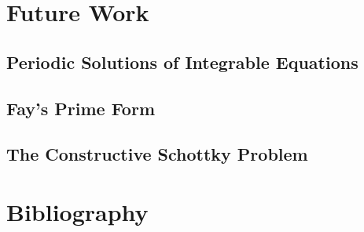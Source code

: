 \documentclass[10pt,twoside]{article}
\numberwithin{equation}{section}
\begin{document}
\section{Future Work}

\subsection{Periodic Solutions of Integrable Equations}

\subsection{Fay's Prime Form}

\subsection{The Constructive Schottky Problem}


\section{Bibliography}






\end{document}
